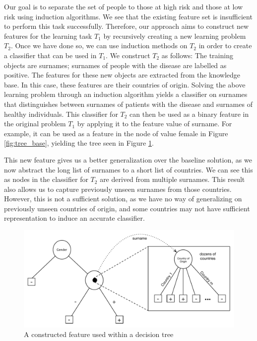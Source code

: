 \documentclass{article}
\theoremstyle{definition}
\begin{document}
Our goal is to separate the set of people to those at high risk and those at low risk using induction algorithms. We see that the existing feature set is insufficient to perform this task successfully. Therefore, our approach aims to construct new features for the learning task $T_1$ by recursively creating a new learning problem $T_2$. Once we have done so, we can use induction methods on $T_2$ in order to create a classifier that can be used in $T_1$. We construct $T_2$ as follows: 
The training objects are surnames; surnames of people with the disease are labelled as positive. The features for these new objects are extracted from the knowledge base. In this case, these features are their countries of origin.
Solving the above learning problem through an induction algorithm yields a classifier on surnames that distinguishes between surnames of patients with the disease and surnames of healthy individuals. This classifier for $T_2$ can then be used as a binary feature in the original problem $T_1$ by applying it to the feature value of surname. For example, it can be used as a feature in the node of value female in Figure \ref{fig:tree_base}, yielding the tree seen in Figure \ref{fig:lvl1_tree}. 

This new feature gives us a better generalization over the baseline solution, as we now abstract the long list of surnames to a short list of countries. We can see this as nodes in the classifier for $T_2$ are derived from multiple surnames. This result also allows us to capture previously unseen surnames from those countries. However, this is not a sufficient solution, as we have no way of generalizing on previously unseen countries of origin, and some countries may not have sufficient representation to induce an accurate classifier. %


\begin{figure}[h]
	\centering
	\includegraphics[width=\linewidth]{fig2.pdf}
	\caption{A constructed feature used within a decision tree}
	\label{fig:lvl1_tree}
\end{figure}
\end{document}
